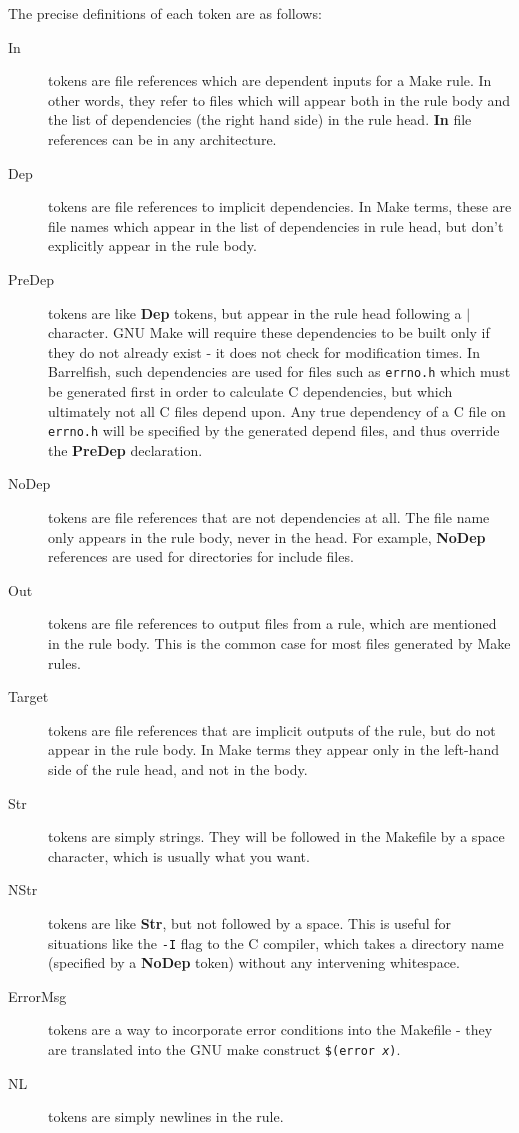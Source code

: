 \documentclass[a4paper,twoside]{report} %
\begin{document}
The precise definitions of each token are as follows:
\begin{description}
\item[In] tokens are file references which are dependent inputs for a
  Make rule.   In other words, they refer to files which will appear
  both in the rule body and the list of dependencies (the right hand
  side) in the rule
  head.  \textbf{In} file references can be in any architecture. 

\item[Dep] tokens are file references to implicit dependencies.  In
  Make terms, these are file names which appear in the list of
  dependencies in rule head, but don't explicitly appear in the rule
  body. 

\item[PreDep] tokens are like \textbf{Dep} tokens, but appear in the
  rule head following a \textbf{$|$} character.  GNU Make will require
  these dependencies to be built only if they do not already exist -
  it does not check for modification times.  In Barrelfish, such
  dependencies are used for files such as \texttt{errno.h} which must
  be generated first in order to calculate C dependencies, but which
  ultimately not all C files depend upon.  Any true dependency of a C
  file on \texttt{errno.h} will be specified by the generated depend
  files, and thus override the \textbf{PreDep} declaration. 

\item[NoDep] tokens are file references that are not dependencies at
  all.  The file name only appears in the rule body, never in the
  head.   For example, \textbf{NoDep} references are used for
  directories for include files. 

\item[Out] tokens are file references to output files from a rule,
  which are mentioned in the rule body. This is the common case for
  most files generated by Make rules. 

\item[Target] tokens are file references that are implicit outputs of
  the rule, but do not appear in the rule body.  In Make terms they
  appear only in the left-hand side of the rule head, and not in the
  body.  

\item[Str] tokens are simply strings.  They will be followed in the
  Makefile by a space character, which is usually what you want.  

\item[NStr] tokens are like \textbf{Str}, but not followed by a
  space.  This is useful for situations like the \texttt{-I} flag to
  the C compiler, which takes a directory name (specified by a
  \textbf{NoDep} token) without any intervening whitespace.

\item[ErrorMsg] tokens are a way to incorporate error conditions into
  the Makefile - they are translated into the GNU make construct
  \texttt{\$(error \textit{x})}. 

\item[NL] tokens are simply newlines in the rule. 

\end{description}
\end{document}
